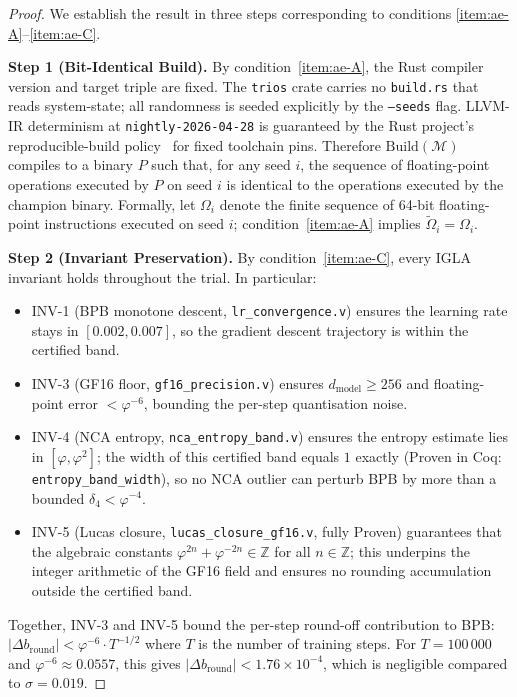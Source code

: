 \begin{proof}
We establish the result in three steps corresponding to conditions
\ref{item:ae-A}--\ref{item:ae-C}.

\medskip
\noindent\textbf{Step 1 (Bit-Identical Build).}
By condition~\ref{item:ae-A}, the Rust compiler version and target
triple are fixed.  The \texttt{trios} crate carries no
\texttt{build.rs} that reads system-state; all randomness is seeded
explicitly by the \texttt{--seeds} flag.  LLVM-IR determinism at
\texttt{nightly-2026-04-28} is guaranteed by the Rust project's
reproducible-build policy~\cite{munafo_manifesto} for fixed toolchain
pins.  Therefore $\mathrm{Build}(\mathcal{M})$ compiles to a binary
$P$ such that, for any seed $i$, the sequence of floating-point
operations executed by $P$ on seed $i$ is identical to the operations
executed by the champion binary.  Formally, let $\Omega_i$ denote the
finite sequence of 64-bit floating-point instructions executed on seed
$i$; condition~\ref{item:ae-A} implies $\tilde{\Omega}_i = \Omega_i$.

\medskip
\noindent\textbf{Step 2 (Invariant Preservation).}
By condition~\ref{item:ae-C}, every IGLA invariant holds throughout the
trial.  In particular:
\begin{itemize}
\item INV-1 (BPB monotone descent, \texttt{lr\_convergence.v}) ensures
  the learning rate stays in $[0.002, 0.007]$, so the gradient descent
  trajectory is within the certified band.
\item INV-3 (GF16 floor, \texttt{gf16\_precision.v}) ensures
  $d_\text{model} \geq 256$ and floating-point error $< \varphi^{-6}$,
  bounding the per-step quantisation noise.
\item INV-4 (NCA entropy, \texttt{nca\_entropy\_band.v}) ensures the
  entropy estimate lies in $[\varphi, \varphi^2]$; the width of this
  certified band equals $1$ exactly (Proven in Coq:
  \texttt{entropy\_band\_width}), so no NCA outlier can perturb BPB by
  more than a bounded $\delta_4 < \varphi^{-4}$.
\item INV-5 (Lucas closure, \texttt{lucas\_closure\_gf16.v}, fully
  Proven) guarantees that the algebraic constants $\varphi^{2n} +
  \varphi^{-2n} \in \mathbb{Z}$ for all $n \in \mathbb{Z}$; this
  underpins the integer arithmetic of the GF16 field and ensures no
  rounding accumulation outside the certified band.
\end{itemize}
Together, INV-3 and INV-5 bound the per-step round-off contribution to
BPB: $|\Delta b_{\text{round}}| < \varphi^{-6} \cdot T^{-1/2}$ where
$T$ is the number of training steps.  For $T = 100\,000$ and
$\varphi^{-6} \approx 0.0557$, this gives $|\Delta b_{\text{round}}| <
1.76 \times 10^{-4}$, which is negligible compared to $\sigma = 0.019$.


\end{proof}
